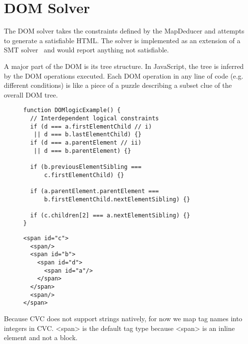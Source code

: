 \section{DOM Solver}
The DOM solver takes the constraints defined by the MapDeducer and attempts to generate a satisfiable HTML.  The solver is implemented as an extension of a SMT solver~\cite{cvc3} and would report anything not satisfiable.  

A major part of the DOM is its tree structure.  In JavaScript, the tree is inferred by the DOM operations executed.  
Each DOM operation in any line of code (e.g. different conditions) is like a piece of a puzzle describing a subset clue of the overall DOM tree.  

\begin{figure}
\begin{lstlisting}[caption=Condensed example extended from Sample Code ~\ref{domOr} demonstrating various DOM operations and their interdependency with each other.,label=domOrExtended]  
function DOMlogicExample() {
  // Interdependent logical constraints
  if (d === a.firstElementChild // i)
   || d === b.lastElementChild) {}
  if (d === a.parentElement // ii)
   || d === b.parentElement) {}
  
  if (b.previousElementSibling === 
      c.firstElementChild) {}
  
  if (a.parentElement.parentElement ===
      b.firstElementChild.nextElementSibling) {}
	  
  if (c.children[2] === a.nextElementSibling) {}  
}
\end{lstlisting}
\end{figure}


\begin{figure}
\begin{lstlisting}[caption=Condensed example extended from Sample Code ~\ref{domOr} demonstrating various DOM operations and their interdependency with each other.,label=domOrExtended]  
<span id="c">
  <span/>
  <span id="b">
    <span id="d">
      <span id="a"/>
	</span>
  </span>
  <span/>
</span>
\end{lstlisting}
\end{figure}




Because CVC does not support strings natively, for now we map tag names into integers in CVC.  
<span> is the default tag type because <span> is an inline element and not a block.

